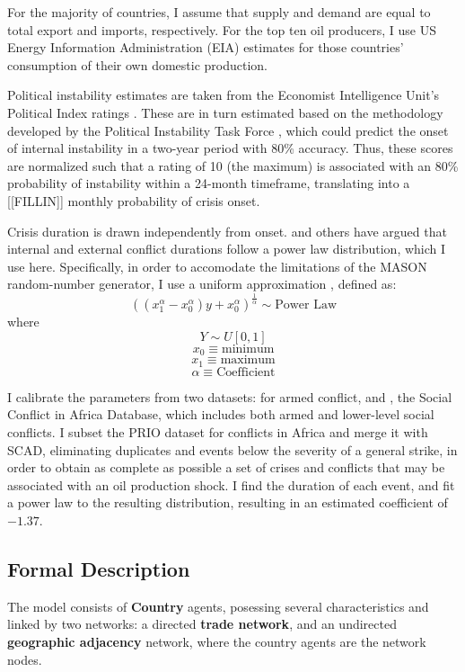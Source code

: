 \documentclass{article}
\begin{document}
For the majority of countries, I assume that supply and demand are equal to total export and imports, respectively. For the top ten oil producers, I use US Energy Information Administration (EIA) estimates \citep{} for those countries' consumption of their own domestic production. 

Political instability estimates are taken from the Economist Intelligence Unit's Political Index ratings \citep{eiu_2013}. These are in turn estimated based on the methodology developed by the Political Instability Task Force \citep{goldstone_2005}, which could predict the onset of internal instability in a two-year period with 80\% accuracy. Thus, these scores are normalized such that a rating of 10 (the maximum) is associated with an 80\% probability of instability within a 24-month timeframe, translating into a [[FILLIN]] monthly probability of crisis onset.

Crisis duration is drawn independently from onset. \citet{cioffi_2004} and others have argued that internal and external conflict durations follow a power law distribution, which I use here. Specifically, in order to accomodate the limitations of the MASON random-number generator, I use a uniform approximation \citep{weisstein_2013}, defined as:
$$
\left((x_{1}^{\alpha} - x_{0}^{\alpha})y + x_{0}^{\alpha}\right)^{\frac{1}{\alpha}} \sim \text{Power Law}
$$
where 
$$Y \sim U[0,1]$$
$$ x_0  \equiv \text{minimum}$$
$$ x_1  \equiv \text{maximum}$$
$$ \alpha \equiv \text{Coefficient}$$

I calibrate the parameters from two datasets: \citet{PRIO} for armed conflict, and \citep{hendrix_2013}, the Social Conflict in Africa Database, which includes both armed and lower-level social conflicts. I subset the PRIO dataset for conflicts in Africa and merge it with SCAD, eliminating duplicates and events below the severity of a general strike, in order to obtain as complete as possible a set of crises and conflicts that may be associated with an oil production  shock. I find the duration of each event, and fit a power law to the resulting distribution, resulting in an estimated coefficient of $\mathbf{-1.37}$.

\subsection{Formal Description}

The model consists of \textbf{Country} agents, posessing several characteristics and linked by two networks: a directed \textbf{trade network}, and an undirected \textbf{geographic adjacency} network, where the country agents are the network nodes.
\end{document}
